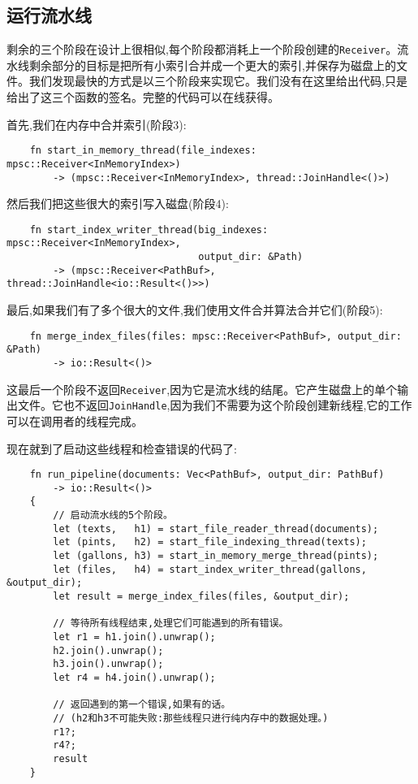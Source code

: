 \subsection{运行流水线}
剩余的三个阶段在设计上很相似,每个阶段都消耗上一个阶段创建的\texttt{Receiver}。流水线剩余部分的目标是把所有小索引合并成一个更大的索引,并保存为磁盘上的文件。我们发现最快的方式是以三个阶段来实现它。我们没有在这里给出代码,只是给出了这三个函数的签名。完整的代码可以在线获得。

首先,我们在内存中合并索引(阶段3):
\begin{verbatim}
    fn start_in_memory_thread(file_indexes: mpsc::Receiver<InMemoryIndex>)
        -> (mpsc::Receiver<InMemoryIndex>, thread::JoinHandle<()>)
\end{verbatim}

然后我们把这些很大的索引写入磁盘(阶段4):
\begin{verbatim}
    fn start_index_writer_thread(big_indexes: mpsc::Receiver<InMemoryIndex>,
                                 output_dir: &Path)
        -> (mpsc::Receiver<PathBuf>, thread::JoinHandle<io::Result<()>>)
\end{verbatim}

最后,如果我们有了多个很大的文件,我们使用文件合并算法合并它们(阶段5):
\begin{verbatim}
    fn merge_index_files(files: mpsc::Receiver<PathBuf>, output_dir: &Path)
        -> io::Result<()>
\end{verbatim}

这最后一个阶段不返回\texttt{Receiver},因为它是流水线的结尾。它产生磁盘上的单个输出文件。它也不返回\texttt{JoinHandle},因为我们不需要为这个阶段创建新线程,它的工作可以在调用者的线程完成。

现在就到了启动这些线程和检查错误的代码了:
\begin{verbatim}
    fn run_pipeline(documents: Vec<PathBuf>, output_dir: PathBuf)
        -> io::Result<()>
    {
        // 启动流水线的5个阶段。
        let (texts,   h1) = start_file_reader_thread(documents);
        let (pints,   h2) = start_file_indexing_thread(texts);
        let (gallons, h3) = start_in_memory_merge_thread(pints);
        let (files,   h4) = start_index_writer_thread(gallons, &output_dir);
        let result = merge_index_files(files, &output_dir);

        // 等待所有线程结束,处理它们可能遇到的所有错误。
        let r1 = h1.join().unwrap();
        h2.join().unwrap();
        h3.join().unwrap();
        let r4 = h4.join().unwrap();

        // 返回遇到的第一个错误,如果有的话。
        // (h2和h3不可能失败:那些线程只进行纯内存中的数据处理。)
        r1?;
        r4?;
        result
    }
\end{verbatim}

